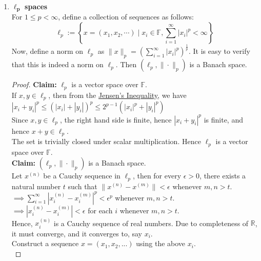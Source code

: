\begin{eg}
\begin{enumerate}
\begin{proof}
            \end{proof}
        \item $\bm{\ell_{p}}$ \textbf{spaces}\\
            For $1\leq p<\infty$, define a collection of sequences as follows:$$\ell_{p}:=\left\{x=(x_{1},x_{2},\cdots)\mid x_{i}\in\mathbb{F}, \sum_{i=1}^{\infty}|x_{i}|^{p}<\infty\right\}$$
            Now, define a norm on $\ell_{p}$ as $\|x\|_{p}=\left(\sum_{i=1}^{\infty}|x_{i}|^{p}\right)^{\frac{1}{p}}$. It is easy to verify that this is indeed a norm on $\ell_{p}$. Then $(\ell_{p},\|\cdot\|_{p})$ is a Banach space.\vspace{0.3cm}\\
            \begin{proof}
                \textbf{Claim:} $\ell_{p}$ is a vector space over $\mathbb{F}$.\\ 
                If $x,y\in\ell_{p}$, then from the \hyperlink{jensen}{Jensen's Inequality}, we have\\ 
                $|x_{i}+y_{i}|^{p}\leq (|x_{i}|+|y_{i}|)^{p}\leq 2^{p-1}\left(|x_{i}|^{p}+|y_{i}|^{p}\right)$\\
                Since $x,y\in\ell_{p}$, the right hand side is finite, hence $|x_{i}+y_{i}|^{p}$ is finite, and hence $x+y\in\ell_{p}$.\\ 
                The set is trivially closed under scalar multiplication. Hence $\ell_{p}$ is a vector space over $\mathbb{F}$.
                \vspace{0.3cm}\\
                \textbf{Claim:} $(\ell_{p},\|\cdot\|_{p})$ is a Banach space.\\
                Let $x^{(n)}$ be a Cauchy sequence in $\ell_{p}$, then for every $\epsilon>0$, there exists a natural number $t$ such that $\|x^{(n)}-x^{(m)}\|<\epsilon$ whenever $m,n>t$.\\ 
                $\implies \sum_{i=1}^{\infty}|x_{i}^{(n)}-x_{i}^{(m)}|^{p}<\epsilon^{p}$ whenever $m,n>t$.\\ 
                $\implies |x_{i}^{(n)}-x_{i}^{(m)}|<\epsilon$ for each $i$ whenever $m,n>t$.\\ 
                Hence, $x_{i}^{(n)}$ is a Cauchy sequence of real numbers. Due to completeness of $\mathbb{R}$, it must converge, and it converges to, say $x_{i}.$\\ 
                Construct a sequence $x = (x_{1}, x_{2},...)$ using the above $x_{i}.$\vspace{0.3cm}\\

\end{proof}
\end{enumerate}
\end{eg}
